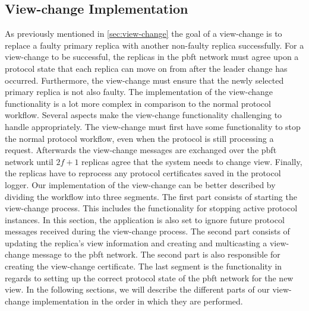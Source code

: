 \subsection{View-change Implementation}
As previously mentioned in \autoref{sec:view-change} the goal of a view-change is to replace a faulty primary replica with another non-faulty replica successfully. For a view-change to be successful, the replicas in the \ac{pbft} network must agree upon a  protocol state that each replica can move on from after the leader change has occurred. Furthermore, the view-change must ensure that the newly selected primary replica is not also faulty. The implementation of the view-change functionality is a lot more complex in comparison to the normal protocol workflow. Several aspects make the view-change functionality challenging to handle appropriately. The view-change must first have some functionality to stop the normal protocol workflow, even when the protocol is still processing a request. Afterwards the view-change messages are exchanged over the \ac{pbft} network until $2f+1$ replicas agree that the system needs to change view. Finally, the replicas have to reprocess any protocol certificates saved in the protocol logger. Our implementation of the view-change can be better described by dividing the workflow into three segments. The first part consists of starting the view-change process. This includes the functionality for stopping active protocol instances. In this section, the application is also set to ignore future protocol messages received during the view-change process. The second part consists of updating the replica’s view information and creating and multicasting a view-change message to the \ac{pbft} network. The second part is also responsible for creating the view-change certificate. The last segment is the functionality in regards to setting up the correct protocol state of the \ac{pbft} network for the new view.
In the following sections, we will describe the different parts of our view-change implementation in the order in which they are performed.

